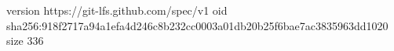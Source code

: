 version https://git-lfs.github.com/spec/v1
oid sha256:918f2717a94a1efa4d246c8b232cc0003a01db20b25f6bae7ac3835963dd1020
size 336
